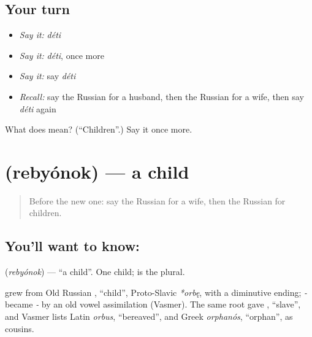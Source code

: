 \subsection*{Your turn}
\begin{itemize}
\raggedright
  \item \emph{Say it:} \emph{déti}
  \item \emph{Say it:} \emph{déti}, once more
  \item \emph{Say it:} say \emph{déti}
  \item \emph{Recall:} say the Russian for a husband, then the Russian for a wife, then say \emph{déti} again
\end{itemize}

\begin{tcolorbox}[breakable,colback=teal!4,colframe=teal!35!black,title={Before you move on}]
What does  mean? (\textquotedblleft{}Children\textquotedblright{}.) Say it once more.
\end{tcolorbox}
\section[\texorpdfstring{\ru{ребёнок} (rebyónok)}{ребёнок (rebyónok)}]{ (rebyónok) — a child}

\label{lesson:RU-C36-child}



\begin{quote}
Before the new one: say the Russian for a wife, then the Russian for children.
\end{quote}

\subsection*{You'll want to know: }
\textbf{} (\emph{rebyónok}) — \textquotedblleft{}a child\textquotedblright{}. One child; \textbf{} is the plural.

\begin{cousinweb}
\textbf{} grew from Old Russian \emph{}, \textquotedblleft{}child\textquotedblright{}, Proto-Slavic \emph{*orbę}, with a diminutive ending; \emph{-} became \emph{-} by an old vowel assimilation (Vasmer). The same root gave \emph{}, \textquotedblleft{}slave\textquotedblright{}, and Vasmer lists Latin \emph{orbus}, \textquotedblleft{}bereaved\textquotedblright{}, and Greek \emph{orphanós}, \textquotedblleft{}orphan\textquotedblright{}, as cousins.
\end{cousinweb}

